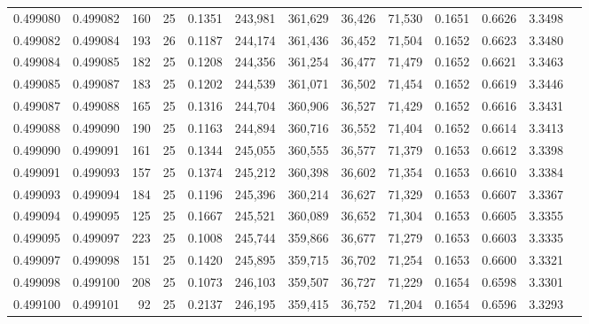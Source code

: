 \begin{tabular}{rrrrrrrrrrrrr}
0.499080 & 0.499082 & 160 &  25 &                                     0.1351 & 243,981 & 361,629 &  36,426 &  71,530 & 0.1651 & 0.6626 & 3.3498 \\
0.499082 & 0.499084 & 193 &  26 &                                     0.1187 & 244,174 & 361,436 &  36,452 &  71,504 & 0.1652 & 0.6623 & 3.3480 \\
0.499084 & 0.499085 & 182 &  25 &                                     0.1208 & 244,356 & 361,254 &  36,477 &  71,479 & 0.1652 & 0.6621 & 3.3463 \\
0.499085 & 0.499087 & 183 &  25 &                                     0.1202 & 244,539 & 361,071 &  36,502 &  71,454 & 0.1652 & 0.6619 & 3.3446 \\
0.499087 & 0.499088 & 165 &  25 &                                     0.1316 & 244,704 & 360,906 &  36,527 &  71,429 & 0.1652 & 0.6616 & 3.3431 \\
0.499088 & 0.499090 & 190 &  25 &                                     0.1163 & 244,894 & 360,716 &  36,552 &  71,404 & 0.1652 & 0.6614 & 3.3413 \\
0.499090 & 0.499091 & 161 &  25 &                                     0.1344 & 245,055 & 360,555 &  36,577 &  71,379 & 0.1653 & 0.6612 & 3.3398 \\
0.499091 & 0.499093 & 157 &  25 &                                     0.1374 & 245,212 & 360,398 &  36,602 &  71,354 & 0.1653 & 0.6610 & 3.3384 \\
0.499093 & 0.499094 & 184 &  25 &                                     0.1196 & 245,396 & 360,214 &  36,627 &  71,329 & 0.1653 & 0.6607 & 3.3367 \\
0.499094 & 0.499095 & 125 &  25 &                                     0.1667 & 245,521 & 360,089 &  36,652 &  71,304 & 0.1653 & 0.6605 & 3.3355 \\
0.499095 & 0.499097 & 223 &  25 &                                     0.1008 & 245,744 & 359,866 &  36,677 &  71,279 & 0.1653 & 0.6603 & 3.3335 \\
0.499097 & 0.499098 & 151 &  25 &                                     0.1420 & 245,895 & 359,715 &  36,702 &  71,254 & 0.1653 & 0.6600 & 3.3321 \\
0.499098 & 0.499100 & 208 &  25 &                                     0.1073 & 246,103 & 359,507 &  36,727 &  71,229 & 0.1654 & 0.6598 & 3.3301 \\
0.499100 & 0.499101 &  92 &  25 &                                     0.2137 & 246,195 & 359,415 &  36,752 &  71,204 & 0.1654 & 0.6596 & 3.3293 \\

\end{tabular}
